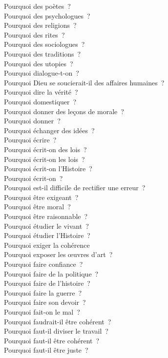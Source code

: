 \documentclass[a4paper,12pt]{article}
\begin{document}
Pourquoi des poètes ? \\
Pourquoi des psychologues ? \\
Pourquoi des religions ? \\
Pourquoi des rites ? \\
Pourquoi des sociologues ? \\
Pourquoi des traditions ? \\
Pourquoi des utopies ? \\
Pourquoi dialogue-t-on ? \\
Pourquoi Dieu se soucierait-il des affaires humaines ? \\
Pourquoi dire la vérité ? \\
Pourquoi domestiquer ? \\
Pourquoi donner des leçons de morale ? \\
Pourquoi donner ? \\
Pourquoi échanger des idées ? \\
Pourquoi écrire ? \\
Pourquoi écrit-on des lois ? \\
Pourquoi écrit-on les lois ? \\
Pourquoi écrit-on l'Histoire ? \\
Pourquoi écrit-on ? \\
Pourquoi est-il difficile de rectifier une erreur ? \\
Pourquoi être exigeant ? \\
Pourquoi être moral ? \\
Pourquoi être raisonnable ? \\
Pourquoi étudier le vivant ? \\
Pourquoi étudier l'Histoire ? \\
Pourquoi exiger la cohérence \\
Pourquoi exposer les œuvres d'art ? \\
Pourquoi faire confiance ? \\
Pourquoi faire de la politique ? \\
Pourquoi faire de l'histoire ? \\
Pourquoi faire la guerre ? \\
Pourquoi faire son devoir ? \\
Pourquoi fait-on le mal ? \\
Pourquoi faudrait-il être cohérent ? \\
Pourquoi faut-il diviser le travail ? \\
Pourquoi faut-il être cohérent ? \\
Pourquoi faut-il être juste ? \\
\end{document}
